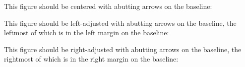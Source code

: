 
\noise

This figure should be centered with abutting arrows on the baseline:

\centerline{\vbox{\ARROWPICTURE}}

\noise

This figure should be left-adjusted with abutting arrows on the
baseline, the leftmost of which is in the left margin on the baseline:

\leftline{\vbox{\ARROWPICTURE}}

\noise

This figure should be right-adjusted with abutting arrows on the
baseline, the rightmost of which is in the right margin on the
baseline:

\rightline{\vbox{\ARROWPICTURE}}

\noise

\vfill
\eject


\bye
